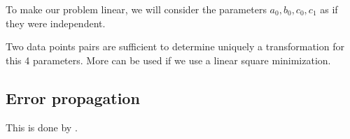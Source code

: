 To make our problem linear, we will consider the parameters $a_0, b_0, c_0, c_1$ as if they were independent.

Two data points pairs are sufficient to determine uniquely a transformation for this 4 parameters. 
More can be used if we use a linear square minimization.


\subsection{Error propagation}

This is done by \citet{1995PASP..107.1119V}.
